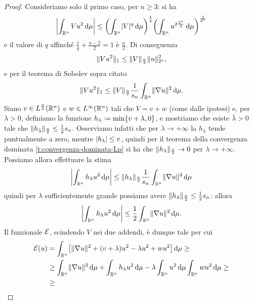 \begin{proof}
    Consideriamo solo il primo caso, per $n\ge 3$: si ha
    \begin{equation}
        \abs[\bigg]{\int_{\R^n}Vu^2\,\dd\mu}\le
        \biggl(\int_{\R^n}\abs{V}^q\,\dd\mu\biggr)^\frac1{q}\biggl(\int_{\R^n}u^{2\frac{{\sobc 2}}2}\,\dd\mu\biggr)^\frac2{{\sobc 2}}
    \end{equation}
    e il valore di $q$ affinch\'e $\frac1{q}+\frac{n-2}2=1$ è $\frac{n}2$.
    Di conseguenza
    \begin{equation}
        \norm{Vu^2}_1\le
        \norm{V}_\frac{n}2\norm{u}_{\sobc 2}^2,
    \end{equation}
    e per il teorema di Sobolev sopra citato
    \begin{equation}
        \norm{Vu^2}_1\le
        \norm{V}_\frac{n}2\frac1{s_n}\int_{\R^n}\norm{\grad u}^2\,\dd\mu.
    \end{equation}
    Siano $v\in\leb[\frac{n}2]{\R^n}$ e $w\in\leb[\infty]{\R^n}$ tali che $V=v+w$ (come dalle ipotesi) e, per $\lambda>0$, definiamo la funzione $h_\lambda\defeq\min\{v+\lambda,0\}$, e mostriamo che esiste $\bar{\lambda}>0$ tale che $\norm{h_{\bar{\lambda}}}_\frac{n}2\le\frac12s_n$.
    Osserviamo infatti che per $\lambda\to+\infty$ la $h_\lambda$ tende puntualmente a zero, mentre $\abs{h_\lambda}\le v$, quindi per il teorema della convergenza dominata \ref{t:convergenza-dominata-Lp} si ha che $\norm{h_\lambda}_\frac{n}2\to 0$ per $\lambda\to+\infty$.
    Possiamo allora effettuare la stima
    \begin{equation}
        \abs[\bigg]{\int_{\R^n}h_\lambda u^2\,\dd\mu}\le
        \norm{h_\lambda}_\frac{n}2\frac1{s_n}\int_{\R^n}\norm{\grad u}^2\,\dd\mu
    \end{equation}
    quindi per $\lambda$ sufficientemente grande possiamo avere $\norm{h_\lambda}_\frac{n}2\le\frac12s_n$: allora
    \begin{equation}
        \abs[\bigg]{\int_{\R^n}h_\lambda u^2\,\dd\mu}\le
        \frac12\int_{\R^n}\norm{\grad u}^2\,\dd\mu.
    \end{equation}
    Il funzionale $\E$, scindendo $V$ nei due addendi, è dunque tale per cui
    \begin{equation}
        \begin{split}
            \E(u)&=
            \int_{\R^n}\bigl[\norm{\grad u}^2+(v+\lambda)u^2-\lambda u^2+wu^2\bigr]\,\dd\mu\ge\\ &\ge
            \int_{\R^n}\norm{\grad u}^2\,\dd\mu+\int_{\R^n}h_\lambda u^2\,\dd\mu-\lambda\int_{\R^n}u^2\,\dd\mu\int_{\R^n}wu^2\,\dd\mu\ge\\ &\ge

\end{split}
\end{equation}
\end{proof}
